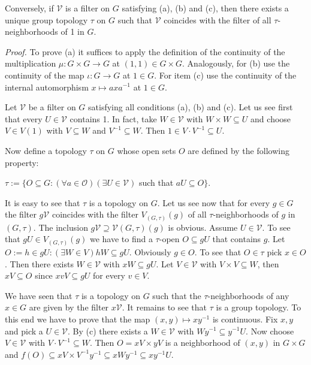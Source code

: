 \documentclass[12pt]{article}
\begin{document}
        Conversely, if $\mathcal{V}$ is a filter on $G$ satisfying (a), (b) and (c), then there exists a unique group topology $\tau$ on
    $G$ such that $\mathcal{V}$ coincides with the filter of all $\tau$-neighborhoods of 1 in $G$.

    
    \emph{Proof.} To prove (a) it suffices to apply the definition of the continuity of the multiplication $\mu : G \times G \to G$ at
    $(1, 1) \in G \times G$. Analogously, for (b) use the continuity of the map $\iota : G \to G$ at $1 \in G$. For item (c) use the
    continuity of the internal automorphism $x \mapsto axa^{-1}$ at $1 \in G$.
    
    
    Let $\mathcal{V}$ be a filter on $G$ satisfying all conditions (a), (b) and (c). Let us see first that every $U \in \mathcal{V}$ contains 1.
    In fact, take $W \in \mathcal{V}$ with $W \times W \subseteq U$ and choose $V \in V(1)$ with $V \subseteq W$ and $V^{-1} \subseteq W$. Then $1 \in V · V^{-1} \subseteq U$.


    Now define a topology $\tau$ on $G$ whose open sets $O$ are defined by the following property:
    
    
    $\tau := \{O \subseteq G : (\forall a \in \mathcal{O})(\exists U \in \mathcal{V})$ such that $aU \subseteq O\}$.
    
    
        It is easy to see that $\tau$ is a topology on $G$. Let us see now that for every $g \in G$ the filter $g \mathcal{V}$ coincides with the filter
    $V_{(G,\tau)}(g)$ of all $\tau$-neighborhoods of $g$ in $(G, \tau)$. The inclusion $g\mathcal{V} \supseteq \mathcal{V}(G,\tau)(g)$ is obvious. Assume $U \in \mathcal{V}$. To see
    that $gU \in V_{(G,\tau)}(g)$ we have to find a $\tau$-open $O \subseteq gU$ that contains $g$. Let $O := {h \in gU : (\exists W \in V) hW \subseteq gU}$.
    Obviously $g \in O$. To see that $O \in \tau$ pick $x \in O$. Then there exists $W \in \mathcal{V}$ with $xW \subseteq gU$. Let $V \in \mathcal{V}$ with
    $V \times V \subseteq W$, then $xV \subseteq O$ since $xvV \subseteq gU$ for every $v \in V$.
    
    
        We have seen that $\tau$ is a topology on $G$ such that the $\tau$-neighborhoods of any $x \in G$ are given by the filter
    $x \mathcal{V}$. It remains to see that $\tau$ is a group topology. To this end we have to prove that the map $(x, y) \mapsto xy^{-1}$ is
    continuous. Fix $x, y$ and pick a $U \in \mathcal{V}$. By (c) there exists a $W \in \mathcal{V}$ with $W y^{-1} \subseteq y^{-1}U$. Now choose $V \in \mathcal{V}$
    with $V · V^{-1} \subseteq W$. Then $O = xV \times yV$ is a neighborhood of $(x, y)$ in $G \times G$ and $f(O) \subseteq xV \times V^{-1}y^{-1} \subseteq xW y^{-1} \subseteq xy^{-1}U$.
    
\end{document}
